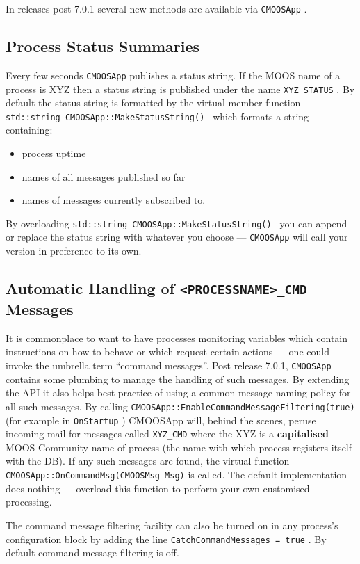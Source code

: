 \documentclass[a4paper,10pt]{article}
\newcommand{\Code}[1]{\texttt{#1} }
\newcommand{\code}[1]{\Code{#1} }
\begin{document}
In releases post 7.0.1 several new methods are available via \code{CMOOSApp}.

\subsection{Process Status Summaries}

Every few seconds \code{CMOOSApp} publishes a status string. If the MOOS name of a process is XYZ then a status string is published under the name \code{XYZ\_STATUS}. By default the status string is formatted by the virtual member function \code{std::string CMOOSApp::MakeStatusString() } which formats a string containing:
\begin{itemize}
\item process uptime
\item names of all messages published so far
\item names of messages currently subscribed to.
\end{itemize}

By overloading \code{std::string CMOOSApp::MakeStatusString() } you can append or replace the status string with whatever you choose --- \code{CMOOSApp} will call your version in preference to its own.

\subsection{Automatic Handling of \code{<PROCESSNAME>\_CMD} Messages}

It is commonplace to want to have processes monitoring variables which contain instructions on how to behave or which request certain actions --- one could invoke the umbrella term ``command messages''. Post release 7.0.1,  \code{CMOOSApp} contains some plumbing to manage the handling of such messages. By extending the API it also helps best practice of using a common message naming policy for all such messages.
By calling \code{CMOOSApp::EnableCommandMessageFiltering(true)} (for example in \code{OnStartup}) CMOOSApp will, behind the scenes, peruse incoming mail for messages called \code{XYZ\_CMD} where the XYZ is a {\textbf{capitalised}} MOOS Community name of process (the  name with which process registers itself with the DB). If any such messages are found, the virtual function \code{CMOOSApp::OnCommandMsg(CMOOSMsg Msg)} is called. The default implementation does nothing --- overload this function to perform your own customised processing.

The command message filtering facility can also be turned on in any process's  configuration block by adding the line \code{CatchCommandMessages = true}. By default command message filtering is off.
\end{document}
